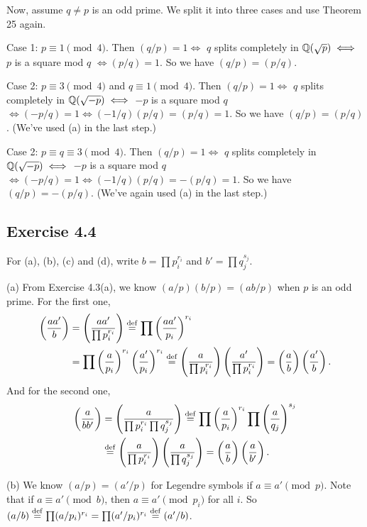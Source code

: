 \documentclass[../Marcus.tex]{subfiles}
\begin{document}
Now, assume $q\neq p$ is an odd prime. We split it into three cases and use Theorem 25 again.

Case 1: $p\equiv 1\pmod{4}$. Then $(q/p)=1 \iff$ $q$ splits completely in $\mathbb{Q}(\sqrt{p}) \iff$ $p$ is a square mod $q$ $\iff (p/q)=1$. So we have $(q/p)=(p/q)$.

Case 2: $p\equiv 3\pmod{4}$ and $q\equiv 1\pmod{4}$. Then $(q/p)=1 \iff$ $q$ splits completely in $\mathbb{Q}(\sqrt{-p}) \iff$ $-p$ is a square mod $q$ $\iff (-p/q)=1 \iff (-1/q)(p/q)=(p/q)=1$. So we have $(q/p)=(p/q)$. (We've used (a) in the last step.)

Case 2: $p\equiv q \equiv3\pmod{4}$. Then $(q/p)=1 \iff$ $q$ splits completely in $\mathbb{Q}(\sqrt{-p}) \iff$ $-p$ is a square mod $q$ $\iff (-p/q)=1 \iff (-1/q)(p/q)=-(p/q)=1$. So we have $(q/p)=-(p/q)$. (We've again used (a) in the last step.)

\subsection*{Exercise 4.4}

For (a), (b), (c) and (d), write $b=\prod p_i^{r_i}$ and $b'=\prod q_j^{s_j}$.

(a) From Exercise 4.3(a), we know $(a/p)(b/p)=(ab/p)$ when $p$ is an odd prime. For the first one,
\begin{align*}
    \left(\dfrac{aa'}{b}\right) &= \left(\dfrac{aa'}{\prod p_i^{r_i}}\right) \overset{\operatorname{def}}{=} \prod\left(\dfrac{aa'}{p_i}\right)^{r_i} \\
    &= \prod \left(\dfrac{a}{p_i}\right)^{r_i}\left(\dfrac{a'}{p_i}\right)^{r_i}
    \overset{\operatorname{def}}{=} \left(\dfrac{a}{\prod p_i^{r_i}}\right)\left(\dfrac{a'}{\prod p_i^{r_i}}\right) = \left(\dfrac{a}{b}\right)\left(\dfrac{a'}{b}\right).
\end{align*}
And for the second one,
\begin{align*}
    \left(\dfrac{a}{bb'}\right) &= \left(\dfrac{a}{\prod p_i^{r_i}\prod q_j^{s_j}}\right) \overset{\operatorname{def}}{=} \prod\left(\dfrac{a}{p_i}\right)^{r_i}\prod\left(\dfrac{a}{q_j}\right)^{s_j} \\
    &\overset{\operatorname{def}}{=} \left(\dfrac{a}{\prod p_i^{r_i}}\right)\left(\dfrac{a}{\prod q_j^{s_j}}\right) = \left(\dfrac{a}{b}\right)\left(\dfrac{a}{b'}\right).
\end{align*}

(b) We know $(a/p)=(a'/p)$ for Legendre symbols if $a\equiv a'\pmod{p}$. Note that if $a\equiv a'\pmod{b}$, then $a\equiv a'\pmod{p_i}$ for all $i$. So $(a/b)\overset{\operatorname{def}}{=}\prod (a/p_i)^{r_i}=\prod (a'/p_i)^{r_i}\overset{\operatorname{def}}{=}(a'/b)$.
\end{document}
